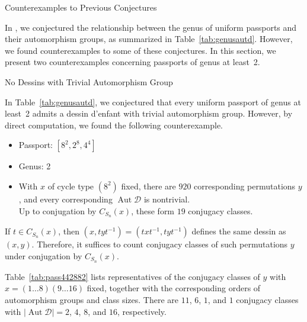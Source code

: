\documentclass[12pt,reqno]{amsart}
\makeatletter
\newif\if@noindentafterheading
\renewcommand\section{\@startsection{section}{1}{\z@}%
  {-3.5ex \@plus -1ex \@minus -.2ex}%
  {2.6ex \@plus .2ex}%
  {\normalfont\large\bfseries}%
}
\renewcommand\subsection{\@startsection{subsection}{2}{\z@}%
  {-2.5ex \@plus -.3ex \@minus -.2ex}%
  {1.5ex \@plus .2ex}%
  {\normalfont\bfseries}%
}
\let\orig@section\section
\renewcommand\section{%
  \@ifstar{\section@star}{\section@nostar}%
}
\newcommand\section@nostar{%
  \@ifnextchar[{\section@opt}{\section@noopt}%
}
\newcommand\section@opt[2][]{%
  \global\@noindentafterheadingtrue
  \orig@section[#1]{#2}%
  \global\@noindentafterheadingfalse
}
\newcommand\section@noopt[1]{%
  \global\@noindentafterheadingtrue
  \orig@section{#1}%
  \global\@noindentafterheadingfalse
}
\newcommand\section@star[1]{%
  \global\@noindentafterheadingtrue
  \orig@section*{#1}%
  \global\@noindentafterheadingfalse
}
\let\orig@subsection\subsection
\renewcommand\subsection{%
  \@ifstar{\subsection@star}{\subsection@nostar}%
}
\newcommand\subsection@nostar{%
  \@ifnextchar[{\subsection@opt}{\subsection@noopt}%
}
\newcommand\subsection@opt[2][]{%
  \global\@noindentafterheadingtrue
  \orig@subsection[#1]{#2}%
  \global\@noindentafterheadingfalse
}
\newcommand\subsection@noopt[1]{%
  \global\@noindentafterheadingtrue
  \orig@subsection{#1}%
  \global\@noindentafterheadingfalse
}
\newcommand\subsection@star[1]{%
  \global\@noindentafterheadingtrue
  \orig@subsection*{#1}%
  \global\@noindentafterheadingfalse
}
\newcommand{\msD}{\mathscr{D}}
\newcommand{\vt}[1]{\left\lvert #1 \right\rvert}					%
\DeclareMathOperator{\Aut}{Aut}							%
\theoremstyle{mythmstyle}
\theoremstyle{mydefstyle}
\newcommand{\tabref}[1]{Table~\ref{#1}}
\newcommand{\dde}{dessin d'enfant\xspace}
\newcommand{\AD}{\Aut{\msD}}
\numberwithin{equation}{section}
\makeatother
\begin{document}
\section{Counterexamples to Previous Conjectures}
\label{sec:counterex}

In \cite{Ohnishi26}, we conjectured the relationship between
the genus of uniform passports and their automorphism groups,
as summarized in \tabref{tab:genusautd}.
However, we found counterexamples to some of these conjectures.
In this section, we present two counterexamples concerning
passports of genus at least~2.

\subsection{No Dessins with Trivial Automorphism Group}

In \tabref{tab:genusautd}, we conjectured that every uniform passport of genus at least~2 admits
a \dde with trivial automorphism group.
However, by direct computation, we found the following counterexample.

\begin{itemize}
\item Passport: $[8^{2}, 2^{8}, 4^{4}]$
\item Genus: 2
\item With $x$ of cycle type $(8^{2})$ fixed, there are $920$ corresponding permutations $y$, and
every corresponding $\AD$ is nontrivial. \\
Up to conjugation by $C_{S_n}(x)$, these form $19$ conjugacy classes.
\end{itemize}

If $t \in C_{S_n}(x)$, then
$(x, tyt^{-1}) = (txt^{-1}, tyt^{-1})$ defines the same dessin as $(x,y)$.
Therefore, it suffices to count conjugacy classes of such permutations $y$
under conjugation by $C_{S_n}(x)$.

\tabref{tab:pass442882} lists representatives of the conjugacy classes of $y$
with $x = (1 \ldots 8)(9 \ldots 16)$ fixed, together with the corresponding orders of automorphism groups
and class sizes.
There are $11$, $6$, $1$, and $1$ conjugacy classes with
$\vt{\AD} = 2$, $4$, $8$, and $16$, respectively.
\end{document}
